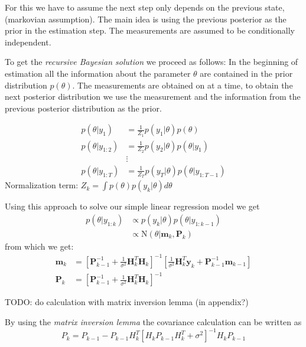 For this we have to assume the next step only
depends on the previous state, (markovian assumption).
The main idea is using the previous posterior as the prior in the estimation
step.
The measurements are assumed to be conditionally independent.

To get the \textit{recursive Bayesian solution} we proceed as follows:
In the beginning of estimation all the information about the parameter $\theta$
are contained in the prior distribution $p(\theta)$.
The measurements are obtained on at a time, to
obtain the next posterior distribution we use the measurement and the information
from the previous posterior distribution as the prior.

\begin{align*}
  p(\theta | y_{1}) &= \frac{1}{Z_1} p(y_1 | \theta) p(\theta) \\
  p(\theta | y_{1:2}) &= \frac{1}{Z_2} p(y_2 | \theta) p(\theta | y_1) \\
                    &\vdots \\
  p(\theta | y_{1:T}) &= \frac{1}{Z_T} p(y_T | \theta) p(\theta | y_{1:T-1})
\end{align*}
Normalization term: $Z_k = \int p(\theta) p(y_k | \theta) d\theta$ %


Using this approach to solve our simple linear regression model we get
\begin{align}
  p(\theta | y_{1:k}) &\propto p(y_k | \theta) p(\theta | y_{1:k-1}) \\
                      &\propto \text{N}(\theta | \mathbf{m}_k, \mathbf{P}_k)
\end{align}
from which we get:
\begin{align}
  \mathbf{m}_k &= \left[ \mathbf{P}^{-1}_{k-1}
                 + \frac{1}{\sigma^2} \mathbf{H}^T_k \mathbf{H}_k \right]^{-1}
                 \left[\frac{1}{\sigma^2} \mathbf{H}^T_k \mathbf{y}_k +
                 \mathbf{P}^{-1}_{k-1} \mathbf{m}_{k-1} \right] \\
  \mathbf{P}_k &= \left[\mathbf{P}_{k-1}^{-1}
                 + \frac{1}{\sigma^2} \mathbf{H}^T_k \mathbf{H}_k \right]^{-1}
\end{align}

TODO: do calculation with matrix inversion lemma (in appendix?)

By using the \textit{matrix inversion lemma} the covariance calculation can be
written as
$$ P_k = P_{k-1} - P_{k-1} H_k^T [H_k P_{k-1} H_k^T + \sigma^2]^{-1} H_k P_{k-1} $$

